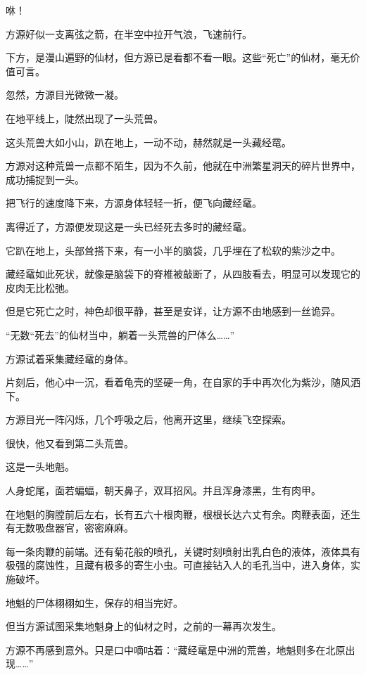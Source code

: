 
\begin{this_body}

咻！

方源好似一支离弦之箭，在半空中拉开气浪，飞速前行。

下方，是漫山遍野的仙材，但方源已是看都不看一眼。这些“死亡”的仙材，毫无价值可言。

忽然，方源目光微微一凝。

在地平线上，陡然出现了一头荒兽。

这头荒兽大如小山，趴在地上，一动不动，赫然就是一头藏经鼋。

方源对这种荒兽一点都不陌生，因为不久前，他就在中洲繁星洞天的碎片世界中，成功捕捉到一头。

把飞行的速度降下来，方源身体轻轻一折，便飞向藏经鼋。

离得近了，方源便发现这是一头已经死去多时的藏经鼋。

它趴在地上，头部耸搭下来，有一小半的脑袋，几乎埋在了松软的紫沙之中。

藏经鼋如此死状，就像是脑袋下的脊椎被敲断了，从四肢看去，明显可以发现它的皮肉无比松弛。

但是它死亡之时，神色却很平静，甚至是安详，让方源不由地感到一丝诡异。

“无数“死去”的仙材当中，躺着一头荒兽的尸体么……”

方源试着采集藏经鼋的身体。

片刻后，他心中一沉，看着龟壳的坚硬一角，在自家的手中再次化为紫沙，随风洒下。

方源目光一阵闪烁，几个呼吸之后，他离开这里，继续飞空探索。

很快，他又看到第二头荒兽。

这是一头地魁。

人身蛇尾，面若蝙蝠，朝天鼻子，双耳招风。并且浑身漆黑，生有肉甲。

在地魁的胸膛前后左右，长有五六十根肉鞭，根根长达六丈有余。肉鞭表面，还生有无数吸盘器官，密密麻麻。

每一条肉鞭的前端。还有菊花般的喷孔，关键时刻喷射出乳白色的液体，液体具有极强的腐蚀性，且藏有极多的寄生小虫。可直接钻入人的毛孔当中，进入身体，实施破坏。

地魁的尸体栩栩如生，保存的相当完好。

但当方源试图采集地魁身上的仙材之时，之前的一幕再次发生。

方源不再感到意外。只是口中嘀咕着：“藏经鼋是中洲的荒兽，地魁则多在北原出现……”


\end{this_body}
